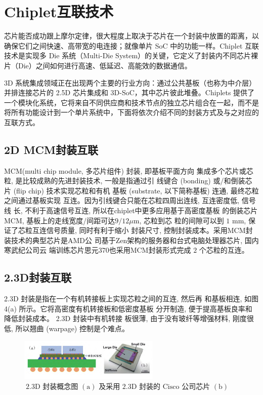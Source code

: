 \section{Chiplet互联技术}

芯片能否成功跟上摩尔定律，很大程度上取决于芯片在一个封装中放置的距离，以确保它们之间快速、高带宽的电连接；就像单片 SoC 中的功能一样。Chiplet 互联技术是实现多 Die 系统（Multi-Die System）的关键，它定义了封装内不同芯片裸片（Die）之间如何进行高速、低延迟、高能效的数据通信。

3D 系统集成领域正在出现两个主要的行业方向：通过公共基板（也称为中介层）并排连接芯片的 2.5D 芯片集成和 3D-SoC，其中芯片彼此堆叠。Chiplets 提供了一个模块化系统，它将来自不同供应商和技术节点的独立芯片组合在一起，而不是将所有功能设计到一个单片系统中，下面将依次介绍不同的封装方式及与之对应的互联方式。

\subsection{2D MCM封装互联}

MCM(multi chip module, 多芯片组件) 封装, 即基板平面方向
集成多个芯片或芯粒, 是比较成熟的先进封装技术, 一般是指通过引
线键合 (bonding) 或/和倒装芯片 (flip chip) 技术实现芯粒和有机
基板 (substrate, 以下简称基板) 连通, 最终芯粒之间通过基板实现
互连。因为引线键合只能在芯粒四周出连线, 互连密度低, 信号线
长, 不利于高速信号互连, 所以在chiplet中更多应用基于高密度基板
的倒装芯片MCM, 基板上的走线宽度/间距可达$9/12\mu\text{m}$, 芯粒到芯
粒的间隙可以到 $1\text{ mm}$, 保证了芯粒互连信号质量, 同时有利于缩小
封装尺寸, 控制封装成本。采用MCM封装技术的典型芯片是AMD公
司基于Zen架构的服务器和台式电脑处理器芯片, 国内寒武纪公司云
端训练芯片思元$370$也采用MCM封装形式完成 $2$ 个芯粒的互连。

\subsection{2.3D封装互联}

2.3D 封装是指在一个有机转接板上实现芯粒之间的互连, 然后再 和基板相连, 如图 4(a) 所示。它将高密度有机转接板和低密度基板 分开制造, 便于提高基板良率和降低封装成本。 2.3D 封装中有机转接 板很薄, 由于没有玻纤等增强材料, 刚度很低, 所以翘曲 (warpage) 控制是个难点。

\begin{figure}[htbp]
	\centering
	\includegraphics[width=0.6\textwidth]{img/3-2.jpg} %
	\caption{$ \ 2.3\text{D}$ 封装概念图 $(\text{a})$ 及采用 $2.3\text{D}$ 封装的 $\text{Cisco}$ 公司芯片 $(\text{b})$ \cite{Miki2019Development}}
	\label{fig:example}
\end{figure}

